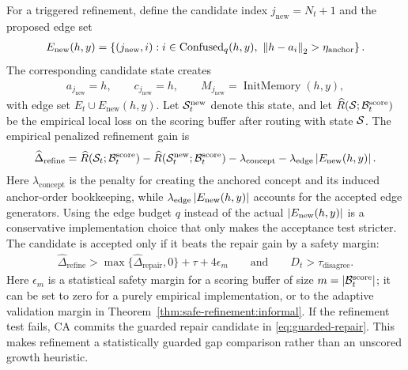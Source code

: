 For a triggered refinement, define the candidate index $j_{\mathrm{new}}=N_t+1$ and the proposed edge set
\begin{align*}
E_{\mathrm{new}}(h,y)
=
\left\{
(j_{\mathrm{new}},i):
i\in\operatorname{Confused}_q(h,y),\
\left\lVert h-a_i\right\rVert_2>\eta_{\mathrm{anchor}}
\right\}.
\end{align*}
The corresponding candidate state creates
\begin{align*}
a_{j_{\mathrm{new}}}=h,\qquad
c_{j_{\mathrm{new}}}=h,\qquad
M_{j_{\mathrm{new}}}=\operatorname{InitMemory}(h,y),
\end{align*}
with edge set $E_t\cup E_{\mathrm{new}}(h,y)$. Let $\mathcal{S}_t^{\mathrm{new}}$ denote this state, and let $\widehat R(\mathcal{S};\mathcal{B}_t^{\mathrm{score}})$ be the empirical local loss on the scoring buffer after routing with state $\mathcal{S}$. The empirical penalized refinement gain is
\begin{align*}
\widehat\Delta_{\mathrm{refine}}
=\widehat R(\mathcal{S}_t;\mathcal{B}_t^{\mathrm{score}})
-
\widehat R(\mathcal{S}_t^{\mathrm{new}};\mathcal{B}_t^{\mathrm{score}})
-
\lambda_{\mathrm{concept}}
-
\lambda_{\mathrm{edge}}\left\lvert E_{\mathrm{new}}(h,y)\right\rvert.
\end{align*}
Here $\lambda_{\mathrm{concept}}$ is the penalty for creating the anchored concept and its induced anchor-order bookkeeping, while $\lambda_{\mathrm{edge}}\left\lvert E_{\mathrm{new}}(h,y)\right\rvert$ accounts for the accepted edge generators. Using the edge budget $q$ instead of the actual $\left\lvert E_{\mathrm{new}}(h,y)\right\rvert$ is a conservative implementation choice that only makes the acceptance test stricter. The candidate is accepted only if it beats the repair gain by a safety margin:
\begin{align}
\widehat\Delta_{\mathrm{refine}}>
\max\{\widehat\Delta_{\mathrm{repair}},0\}
+\tau+4\epsilon_m
\qquad\text{and}\qquad
D_t>\tau_{\mathrm{disagree}}.
\label{eq:refine-accept}
\end{align}
Here $\epsilon_m$ is a statistical safety margin for a scoring buffer of size $m=\left\lvert\mathcal{B}_t^{\mathrm{score}}\right\rvert$; it can be set to zero for a purely empirical implementation, or to the adaptive validation margin in Theorem~\ref{thm:safe-refinement:informal}. If the refinement test fails, CA commits the guarded repair candidate in \eqref{eq:guarded-repair}. This makes refinement a statistically guarded gap comparison rather than an unscored growth heuristic.

